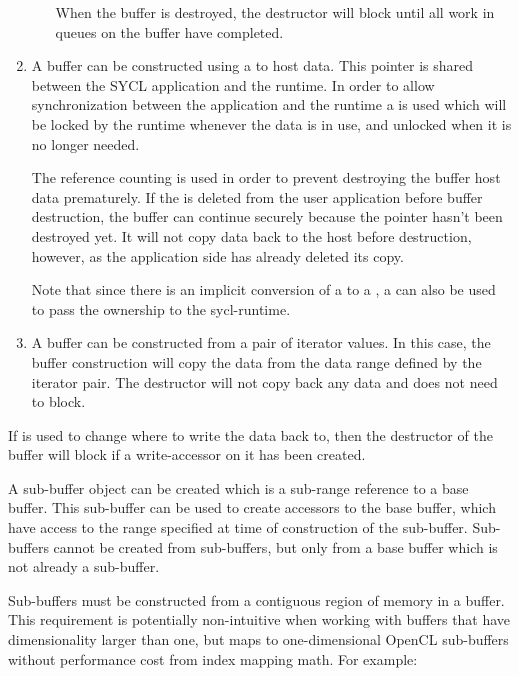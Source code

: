 \begin{enumerate}
\begin{enumerate}
    When the buffer is destroyed, the destructor will block until all
    work in queues on the buffer have completed.

  \end{enumerate}

  \item
    A buffer can be constructed using a  to host data.
    This pointer is shared between the SYCL application and the runtime. In order
    to allow synchronization between the application and the runtime a
     is used which will be locked by the runtime whenever the
    data is in use, and unlocked when it is no longer needed.

    The  reference counting is used in order to prevent
    destroying the buffer host data prematurely. If the
     is deleted from the user application before buffer
    destruction, the buffer can continue securely because the pointer
    hasn't been destroyed yet.  It will not copy data back to the host before destruction, however,
    as the application side has already deleted its copy.

    Note that since there is an implicit conversion of a
     to a , a
     can also be used to pass the
    ownership to the \gls{sycl-runtime}.

  \item
    A buffer can be constructed from a pair of iterator values. In
    this case, the buffer construction will copy the data from the
    data range defined by the iterator pair. The destructor will
    not copy back any data and does not need to block.
    
  \end{enumerate}

If  is used to change where to write the
data back to, then the destructor of the buffer will block if a
write-accessor on it has been created.

A sub-buffer object can be created which is a sub-range reference to a
base buffer. This sub-buffer can be used to create accessors to the
base buffer, which have access to the range specified at time
of construction of the sub-buffer.  Sub-buffers cannot be created from
sub-buffers, but only from a base buffer which is not already a sub-buffer.

Sub-buffers must be constructed from a contiguous region of memory in a buffer.  This
requirement is potentially non-intuitive when working with buffers that have dimensionality
larger than one, but maps to one-dimensional OpenCL sub-buffers without performance cost
from index mapping math.  For example:

